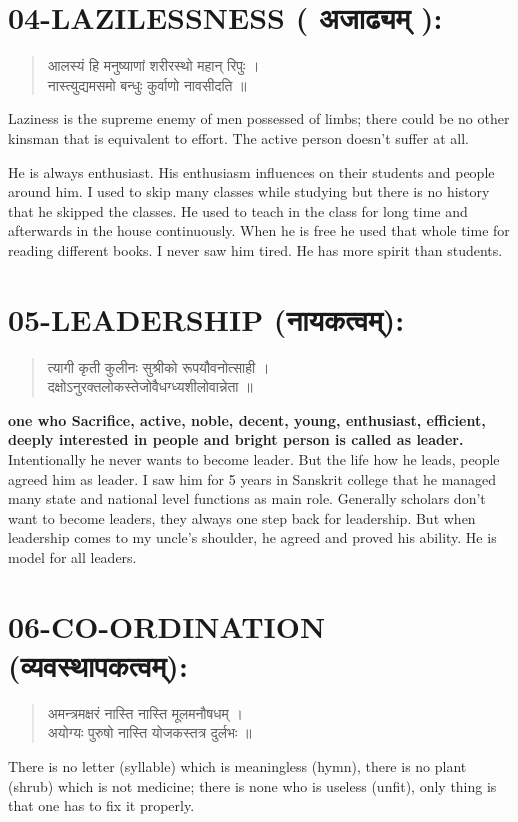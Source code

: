 \section*{04-LAZILESSNESS ( अजाढ्यम् ):}
\begin{verse}
आलस्यं हि मनुष्याणां शरीरस्थो महान् रिपुः ।\\
नास्त्युद्यमसमो बन्धुः कुर्वाणो नावसीदति ॥
\end{verse}
Laziness is the supreme enemy of men possessed of limbs; there could be no other kinsman that is equivalent to effort. The active person doesn’t suffer at all.

He is always enthusiast. His enthusiasm influences on their students and people around him. I used to skip many classes while studying but there is no history that he skipped the classes. He used to teach in the class for long time and afterwards in the house continuously. When he is free he used that whole time for reading different books. I never saw him tired. He has more spirit than students.

\section*{05-LEADERSHIP (नायकत्वम्):}
\begin{verse}
त्यागी कृती कुलीनः सुश्रीको रूपयौवनोत्साही ।\\
दक्षोऽनुरक्तलोकस्तेजोवैधग्ध्यशीलोवान्नेता ॥
\end{verse}
\textbf{one who Sacrifice, active, noble, decent, young, enthusiast, efficient, deeply interested in people and bright person is called as leader.}
Intentionally he never wants to become leader. But the life how he leads, people agreed him as leader. I saw him for 5 years in Sanskrit college that he managed many state and national level functions as main role. Generally scholars don’t want to become leaders, they always one step back for leadership. But when leadership comes to my uncle’s shoulder, he agreed and proved his ability. He is model for all leaders.

\section*{06-CO-ORDINATION (व्यवस्थापकत्वम्):}
\begin{verse}
अमन्त्रमक्षरं नास्ति नास्ति मूलमनौषधम् ।\\
अयोग्यः पुरुषो नास्ति योजकस्तत्र दुर्लभः ॥
\end{verse}
There is no letter (syllable) which is meaningless (hymn), there is no plant (shrub) which is not medicine; there is none who is useless (unfit), only thing is that one has to fix it properly.

